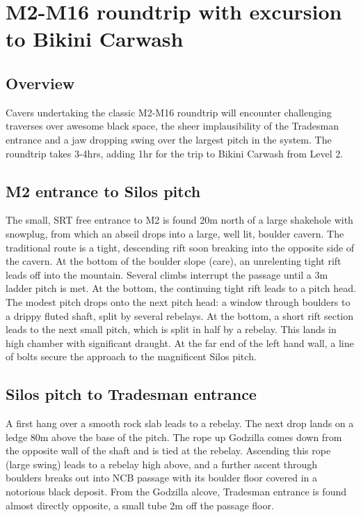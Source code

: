 \section{M2-M16 roundtrip with excursion to Bikini Carwash}
\subsection{Overview}
Cavers undertaking the classic M2-M16 roundtrip will encounter challenging traverses over awesome black space, the sheer implausibility of the Tradesman entrance and a jaw dropping swing over the largest pitch in the system. The roundtrip takes 3-4hrs, adding 1hr for the trip to Bikini Carwash from Level 2. 

\subsection{ M2 entrance to Silos pitch}
The small, SRT free entrance to M2 is found 20m north of a large shakehole with snowplug, from which an abseil drops into a large, well lit, boulder cavern. The traditional route is a tight, descending rift soon breaking into the opposite side of the cavern. At the bottom of the boulder slope (care), an unrelenting tight rift leads off into the mountain. Several climbs interrupt the passage until a 3m ladder pitch is met. At the bottom, the continuing tight rift leads to a pitch head. The modest pitch drops onto the next pitch head: a window through boulders to a drippy fluted shaft, split by several rebelays. At the bottom, a short rift section leads to the next small pitch, which is split in half by a rebelay. This lands in high chamber with significant draught. At the far end of the left hand wall, a line of bolts secure the approach to the magnificent Silos pitch. 

\subsection{Silos pitch to Tradesman entrance}
A first hang over a smooth rock slab leads to a rebelay. The next drop lands on a ledge 80m above the base of the pitch. The rope up Godzilla comes down from the opposite wall of the shaft and is tied at the rebelay. Ascending this rope (large swing) leads to a rebelay high above, and a further ascent through boulders breaks out into NCB passage with its boulder floor covered in a notorious black deposit. From the Godzilla alcove, Tradesman entrance is found almost directly opposite, a small tube 2m off the passage floor. 

